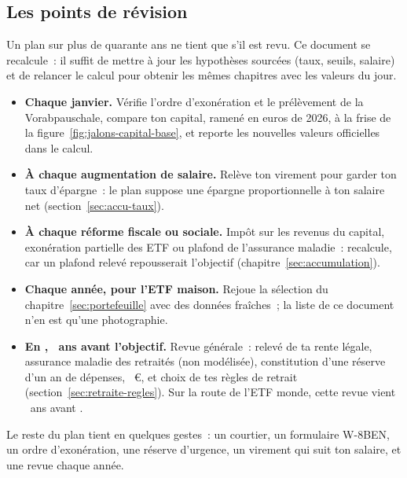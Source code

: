 \subsection{Les points de r\'evision}\label{sec:plan-revision}

Un plan sur plus de quarante ans ne tient que s'il est revu. Ce document se recalcule~: il suffit de
mettre \`a jour les hypoth\`eses sourc\'ees (taux, seuils, salaire) et de relancer le calcul pour
obtenir les m\^emes chapitres avec les valeurs du jour.

\begin{itemize}
  \item \textbf{Chaque janvier.} V\'erifie l'ordre d'exon\'eration et le pr\'el\`evement de la
  Vorabpauschale, compare ton capital, ramen\'e en euros de 2026, \`a la frise de la
  figure~\ref{fig:jalons-capital-base}, et reporte les nouvelles valeurs officielles dans le calcul.
  \item \textbf{\`A chaque augmentation de salaire.} Rel\`eve ton virement pour garder ton taux
  d'\'epargne~: le plan suppose une \'epargne proportionnelle \`a ton salaire net
  (section~\ref{sec:accu-taux}).
  \item \textbf{\`A chaque r\'eforme fiscale ou sociale.} Imp\^ot sur les revenus du capital,
  exon\'eration partielle des ETF ou plafond de l'assurance maladie~: recalcule, car un plafond
  relev\'e repousserait l'objectif (chapitre~\ref{sec:accumulation}).
  \item \textbf{Chaque ann\'ee, pour l'ETF maison.} Rejoue la s\'election du
  chapitre~\ref{sec:portefeuille} avec des donn\'ees fra\^iches~; la liste de ce document n'en est
  qu'une photographie.
  \item \textbf{En \AnneeRevueAvantObjectif, \RevueAvantObjectifAns~ans avant l'objectif.} Revue
  g\'en\'erale~: relev\'e de ta rente l\'egale, assurance maladie des retrait\'es (non mod\'elis\'ee),
  constitution d'une r\'eserve d'un an de d\'epenses, \ZielJahr~€, et choix de tes r\`egles de retrait
  (section~\ref{sec:retraite-regles}). Sur la route de l'ETF monde, cette revue vient
  \RevueAvantObjectifAns~ans avant \AnneeEtfBasis.
\end{itemize}

 Le reste du
plan tient en quelques gestes~: un courtier, un formulaire W-8BEN, un ordre d'exon\'eration, une
r\'eserve d'urgence, un virement qui suit ton salaire, et une revue chaque ann\'ee.

